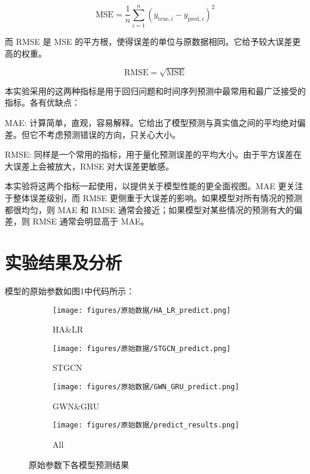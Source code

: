 \documentclass[4pt]{article}
\begin{document}
\[
\text{MSE} = \frac{1}{n} \sum_{i=1}^{n} \left( y_{\text{true}, i} - y_{\text{pred}, i} \right)^2
\]

而 RMSE 是 MSE 的平方根，使得误差的单位与原数据相同。它给予较大误差更高的权重。

\[
\text{RMSE} = \sqrt{\text{MSE}}
\]

本实验采用的这两种指标是用于回归问题和时间序列预测中最常用和最广泛接受的指标。各有优缺点：

MAE: 计算简单，直观，容易解释。它给出了模型预测与真实值之间的平均绝对偏差。但它不考虑预测错误的方向，只关心大小。

RMSE: 同样是一个常用的指标，用于量化预测误差的平均大小。由于平方误差在大误差上会被放大，RMSE 对大误差更敏感。

本实验将这两个指标一起使用，以提供关于模型性能的更全面视图。MAE 更关注于整体误差级别，而 RMSE 更侧重于大误差的影响。如果模型对所有情况的预测都很均匀，则 MAE 和 RMSE 通常会接近；如果模型对某些情况的预测有大的偏差，则 RMSE 通常会明显高于 MAE。

\section{实验结果及分析}

模型的原始参数如图1中代码所示：



\begin{figure}[h]
    \centering
    \begin{subfigure}{0.423\textwidth}
        \texttt{[image: figures/原始数据/HA\_LR\_predict.png]}
        \caption{HA\&LR}
    \end{subfigure}
    \begin{subfigure}{0.45\textwidth}
        \texttt{[image: figures/原始数据/STGCN\_predict.png]}
        \caption{STGCN}
    \end{subfigure}
    \begin{subfigure}{0.45\textwidth}
        \texttt{[image: figures/原始数据/GWN\_GRU\_predict.png]}
        \caption{GWN\&GRU}
    \end{subfigure}
    \begin{subfigure}{0.45\textwidth}
        \texttt{[image: figures/原始数据/predict\_results.png]}
        \caption{All}
    \end{subfigure}
    \caption{原始参数下各模型预测结果}
\end{figure}
\end{document}
